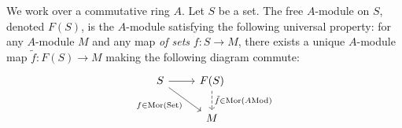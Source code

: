 \documentclass[12pt]{article}
\begin{document}
\begin{example}
	We work over a commutative ring $A$. Let $S$ be a set. The free $A$-module on $S$, denoted $F(S)$, is the $A$-module satisfying the following universal property: for any $A$-module $M$ and any map \textit{of sets} $f:S\to M$, there exists a unique $A$-module map $\tilde{f}:F(S)\to M$ making the following diagram commute:
	\begin{equation*}
\begin{tikzcd}
S \arrow[r] \arrow[rd, "f\in\text{Mor}(\text{Set})"'] & F(S) \arrow[d, "\tilde{f}\in \text{Mor}(A\text{Mod})", dashed] \\
                                                      & M                                                             
\end{tikzcd}
	\end{equation*}
\end{example}


\end{document}
